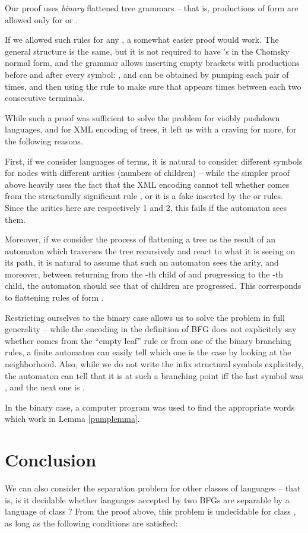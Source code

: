 \documentclass{article}
\begin{document}
Our proof uses {\it binary} flattened tree grammars -- that is,
productions of form  are allowed only for 
or .

If we allowed such rules for any , a somewhat easier proof would work.
The general structure is the same, but
it is not required to have 's in the Chomsky normal form, 
and the grammar  allows inserting empty brackets with productions 
 before and after every symbol:
, and 
can be obtained by pumping each pair of   times, and then
using the rule  to make sure that  appears
 times between each two consecutive terminals.

While such a proof 
was sufficient to solve the problem for visibly pushdown languages, and for
XML encoding of trees, it left us with a craving for more, for the following
reasons.

First, if we consider languages of terms, it is natural to consider
different symbols for nodes with different arities (numbers of children) --
while the simpler proof above heavily uses the fact that the XML encoding cannot
tell whether  comes from the structurally significant rule ,
or it is a fake inserted by the  or  rules.
Since the arities here are respectively  1 and 2, this fails if
the automaton sees them.

Moreover, if we consider the process of flattening a tree as the result of an
automaton which traverses the tree recursively and react to what it is seeing on its path,
it is natural to assume that such an automaton sees the arity, and moreover, 
between returning from the -th child of  and progressing to the -th child,
the automaton should see that  of  children are progressed. This corresponds
to flattening rules of form .

Restricting ourselves to the binary case allows us to solve the problem in full
generality -- while the encoding in the definition of BFG does not explicitely 
say whether  comes from 
the ``empty leaf'' rule  or from one of the binary branching rules,
a finite automaton can easily tell which one is the case by looking at the neighborhood.
Also, while we do not write the infix structural symbols  explicitely,
the automaton can tell that it is at such a branching point iff the last symbol was ,
and the next one is .

In the binary case, a computer program was used to find the 
appropriate words  which work in Lemma \ref{pumplemma}.

\section{Conclusion}
We can also consider the separation problem for other classes of languages --
that is, is it decidable whether languages accepted by two BFGs are separable
by a language of class ? From the proof above, this problem is undecidable
for class , as long as the following conditions are satisfied:
\end{document}
